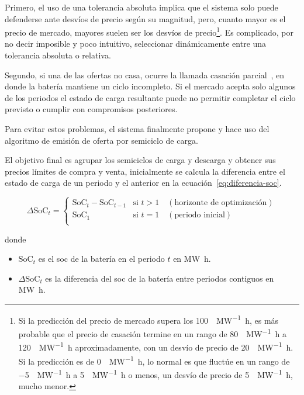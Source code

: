 Primero, el uso de una tolerancia absoluta implica que el sistema solo puede defenderse ante desvíos de precio según su magnitud, pero, cuanto mayor es el precio de mercado, mayores suelen ser los desvíos de precio\footnote{Si la predicción del precio de mercado supera los \SI{100}{\text{\euro}\per\mega\watt\hour}, es más probable que el precio de casación termine en un rango de \SI{80}{\text{\euro}\per\mega\watt\hour} a \SI{120}{\text{\euro}\per\mega\watt\hour} aproximadamente, con un desvío de precio de \SI{20}{\text{\euro}\per\mega\watt\hour}. Si la predicción es de \SI{0}{\text{\euro}\per\mega\watt\hour}, lo normal es que fluctúe en un rango de \SI{-5}{\text{\euro}\per\mega\watt\hour} a \SI{5}{\text{\euro}\per\mega\watt\hour} o menos, un desvío de precio de \SI{5}{\text{\euro}\per\mega\watt\hour}, mucho menor.}. Es complicado, por no decir imposible y poco intuitivo, seleccionar dinámicamente entre una tolerancia absoluta o relativa.

Segundo, si una de las ofertas no casa, ocurre la llamada casación parcial~\cite{cnmc2024mercados}, en donde la batería mantiene un ciclo incompleto. Si el mercado acepta solo algunos de los periodos el estado de carga resultante puede no permitir completar el ciclo previsto o cumplir con compromisos posteriores.

Para evitar estos problemas, el sistema finalmente propone y hace uso del algoritmo de emisión de oferta por semiciclo de carga.

El objetivo final es agrupar los semiciclos de carga y descarga y obtener sus precios límites de compra y venta, inicialmente se calcula la diferencia entre el estado de carga de un periodo y el anterior en la ecuación~\ref{eq:diferencia-soc}.

\begin{samepage}

  \begin{equation}
    \label{eq:diferencia-soc}
    \Delta \mathrm{SoC}_{t} =
    \begin{cases}
      \mathrm{SoC}_{t} - \mathrm{SoC}_{t - 1} & \text{si } t > 1 \quad (\text{horizonte de optimización}) \\
      \mathrm{SoC}_{1}                      & \text{si } t = 1 \quad (\text{periodo inicial})           \\
    \end{cases}
  \end{equation}

  donde

  \begin{itemize}

    \item \( \mathrm{SoC}_{t} \) es el \gls{soc} de la batería en el periodo \( t \) en \si{{\mega\watt\hour}}.

    \item \( \Delta \mathrm{SoC}_{t} \) es la diferencia del \gls{soc} de la batería entre periodos contiguos en \si{{\mega\watt\hour}}.

  \end{itemize}

\end{samepage}

